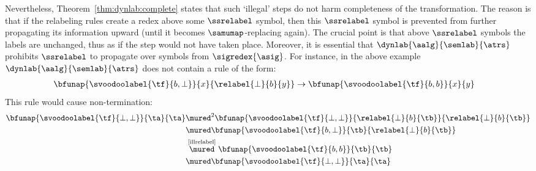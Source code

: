 \begin{example}
  Nevertheless, Theorem~\ref{thm:dynlab:complete}
  states that such `illegal' steps do not harm completeness of the transformation.
  The reason is that if the relabeling rules create a redex above
  some $\ssrelabel$ symbol, then this $\ssrelabel$ symbol
  is prevented from further propagating its information upward
  (until it becomes $\samumap$-replacing again).
  The crucial point is that above $\ssrelabel$ symbols
  the labels are unchanged, thus as if the step would not have taken place.
  Moreover, it is essential that $\dynlab{\aalg}{\semlab}{\atrs}$ 
  prohibits $\ssrelabel$ to propagate over symbols from $\sigredex{\asig}$.
  For instance, in the above example $\dynlab{\aalg}{\semlab}{\atrs}$
  does not contain a rule of the form:
  \begin{align}
    \bfunap{\svoodoolabel{\tf}{b,\bot}}{x}{\relabel{\bot}{b}{y}} &\to \bfunap{\svoodoolabel{\tf}{b,b}}{x}{y}
    \label{illrelabel}
  \end{align}
  This rule would cause non-termination: 
  \begin{align*}
    \bfunap{\svoodoolabel{\tf}{\bot,\bot}}{\ta}{\ta} 
    & \mured^2 
    \bfunap{\svoodoolabel{\tf}{\bot,\bot}}{\relabel{\bot}{b}{\tb}}{\relabel{\bot}{b}{\tb}} \\
    & \mured
    \bfunap{\svoodoolabel{\tf}{b,\bot}}{\tb}{\relabel{\bot}{b}{\tb}}
    \\
    & \stackrel{\text{\eqref{illrelabel}}}{\mured}
    \bfunap{\svoodoolabel{\tf}{b,b}}{\tb}{\tb}
    \\
    & \mured
    \bfunap{\svoodoolabel{\tf}{\bot,\bot}}{\ta}{\ta}
  \end{align*}
\end{example}

